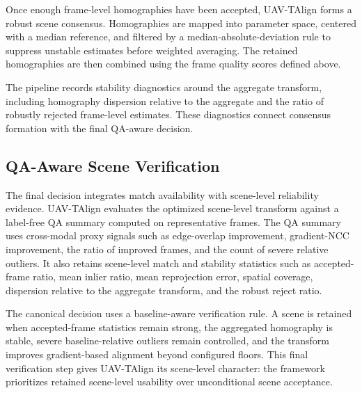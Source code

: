 Once enough frame-level homographies have been accepted, UAV-TAlign forms a robust scene consensus.
Homographies are mapped into parameter space, centered with a median reference, and filtered by a
median-absolute-deviation rule to suppress unstable estimates before weighted averaging. The
retained homographies are then combined using the frame quality scores defined above.

The pipeline records stability diagnostics around the aggregate transform, including homography
dispersion relative to the aggregate and the ratio of robustly rejected frame-level estimates.
These diagnostics connect consensus formation with the final QA-aware decision.

\subsection{QA-Aware Scene Verification}

The final decision integrates match availability with scene-level reliability evidence. UAV-TAlign
evaluates the optimized scene-level transform against a label-free QA summary computed on
representative frames. The QA summary uses cross-modal proxy signals such as edge-overlap
improvement, gradient-NCC improvement, the ratio of improved frames, and the count of severe
relative outliers. It also retains scene-level match and stability statistics such as accepted-frame
ratio, mean inlier ratio, mean reprojection error, spatial coverage, dispersion relative to the
aggregate transform, and the robust reject ratio.

The canonical decision uses a baseline-aware verification rule. A scene is retained when
accepted-frame statistics remain strong, the aggregated homography is stable, severe
baseline-relative outliers remain controlled, and the transform improves gradient-based alignment
beyond configured floors. This final verification step gives UAV-TAlign its scene-level character:
the framework prioritizes retained scene-level usability over unconditional scene acceptance.

